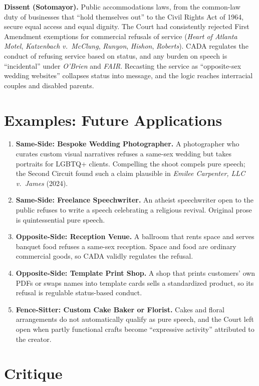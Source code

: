 \documentclass[12pt]{article}
\begin{document}
\textbf{Dissent (Sotomayor).} Public accommodations laws, from the common-law duty of businesses that ``hold themselves out'' to the Civil Rights Act of 1964, secure equal access and equal dignity. The Court had consistently rejected First Amendment exemptions for commercial refusals of service (\textit{Heart of Atlanta Motel}, \textit{Katzenbach v.\ McClung}, \textit{Runyon}, \textit{Hishon}, \textit{Roberts}). CADA regulates the conduct of refusing service based on status, and any burden on speech is ``incidental'' under \textit{O'Brien} and \textit{FAIR}. Recasting the service as ``opposite-sex wedding websites'' collapses status into message, and the logic reaches interracial couples and disabled parents.

\section{Examples: Future Applications}

\begin{enumerate}
\item \textbf{Same-Side: Bespoke Wedding Photographer.} A photographer who curates custom visual narratives refuses a same-sex wedding but takes portraits for LGBTQ+ clients. Compelling the shoot compels pure speech; the Second Circuit found such a claim plausible in \textit{Emilee Carpenter, LLC v.\ James} (2024).
\item \textbf{Same-Side: Freelance Speechwriter.} An atheist speechwriter open to the public refuses to write a speech celebrating a religious revival. Original prose is quintessential pure speech.
\item \textbf{Opposite-Side: Reception Venue.} A ballroom that rents space and serves banquet food refuses a same-sex reception. Space and food are ordinary commercial goods, so CADA validly regulates the refusal.
\item \textbf{Opposite-Side: Template Print Shop.} A shop that prints customers' own PDFs or swaps names into template cards sells a standardized product, so its refusal is regulable status-based conduct.
\item \textbf{Fence-Sitter: Custom Cake Baker or Florist.} Cakes and floral arrangements do not automatically qualify as pure speech, and the Court left open when partly functional crafts become ``expressive activity'' attributed to the creator.
\end{enumerate}

\section{Critique}
\end{document}
